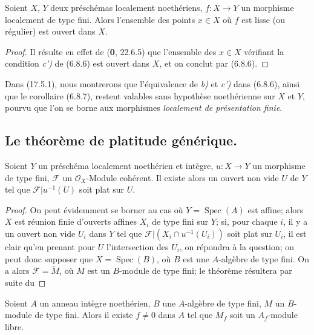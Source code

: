 \begin{corollary}[6.8.7]
\label{IV.2.s6.8.7-fr}
Soient $X$, $Y$ deux préschémas localement noethériens, $f:X\to Y$ un
morphisme localement de type fini. Alors l'ensemble des points $x\in X$ où
$f$ est lisse (\textup{ou} régulier) est ouvert dans $X$.
\end{corollary}

\begin{proof}
Il résulte en effet de (\textbf{0}, 22.6.5) que l'ensemble des $x\in X$ vérifiant la
condition \emph{c')} de (6.8.6) est ouvert dans $X$, et on conclut par (6.8.6).
\end{proof}

\begin{remark}[6.8.8]
\label{IV.2.s6.8.8-fr}
Dans (17.5.1), nous montrerons que l'équivalence de \emph{b)} et \emph{c')} dans (6.8.6),
ainsi que le corollaire (6.8.7), restent valables sans hypothèse noethérienne
sur $X$ et $Y$, pourvu que l'on se borne aux morphismes \emph{localement de
présentation finie}.
\end{remark}

\subsection{Le théorème de platitude générique.}
\label{subsection:IV.6.9}

\begin{theorem}[6.9.1]
\label{IV.2.s6.9.1-fr}
Soient $Y$ un préschéma localement noethérien et intègre, $u:X\to Y$ un
morphisme de type fini, $\mathcal F$ un $\mathcal O_X$-Module cohérent. Il
existe alors un ouvert non vide $U$ de $Y$ tel que
$\mathcal F|u^{-1}(U)$ soit plat sur $U$.
\end{theorem}

\begin{proof}
On peut évidemment se borner au cas où $Y=\operatorname{Spec}(A)$ est affine;
alors $X$ est réunion finie d'ouverts affines $X_i$ de type fini sur $Y$; si,
pour chaque $i$, il y a un ouvert non vide $U_i$ dans $Y$ tel que
$\mathcal F|(X_i\cap u^{-1}(U_i))$ soit plat sur $U_i$, il est clair qu'en
prenant pour $U$ l'intersection des $U_i$, on répondra à la question; on peut
donc supposer que $X=\operatorname{Spec}(B)$, où $B$ est une $A$-algèbre de
type fini. On a alors $\mathcal F=\widetilde M$, où $M$ est un $B$-module de
type fini; le théorème résultera par suite du
\end{proof}

\begin{lemma}[6.9.2]
\label{IV.2.s6.9.2-fr}
Soient $A$ un anneau intègre noethérien, $B$ une $A$-algèbre de type fini,
$M$ un $B$-module de type fini. Alors il existe $f\ne0$ dans $A$ tel que
$M_f$ soit un $A_f$-module libre.
\end{lemma}

